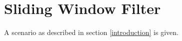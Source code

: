\section{Sliding Window Filter} \label{sliding_window_filter}
A scenario as described in section \ref{introduction} is given.
